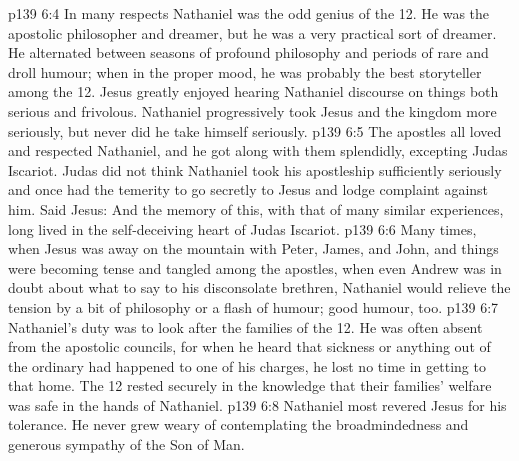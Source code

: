 \vs p139 6:4 In many respects Nathaniel was the odd genius of the 12. He was the apostolic philosopher and dreamer, but he was a very practical sort of dreamer. He alternated between seasons of profound philosophy and periods of rare and droll humour; when in the proper mood, he was probably the best storyteller among the 12. Jesus greatly enjoyed hearing Nathaniel discourse on things both serious and frivolous. Nathaniel progressively took Jesus and the kingdom more seriously, but never did he take himself seriously.
\vs p139 6:5 The apostles all loved and respected Nathaniel, and he got along with them splendidly, excepting Judas Iscariot. Judas did not think Nathaniel took his apostleship sufficiently seriously and once had the temerity to go secretly to Jesus and lodge complaint against him. Said Jesus:  And the memory of this, with that of many similar experiences, long lived in the self\hyp{}deceiving heart of Judas Iscariot.
\vs p139 6:6 Many times, when Jesus was away on the mountain with Peter, James, and John, and things were becoming tense and tangled among the apostles, when even Andrew was in doubt about what to say to his disconsolate brethren, Nathaniel would relieve the tension by a bit of philosophy or a flash of humour; good humour, too.
\vs p139 6:7 Nathaniel’s duty was to look after the families of the 12. He was often absent from the apostolic councils, for when he heard that sickness or anything out of the ordinary had happened to one of his charges, he lost no time in getting to that home. The 12 rested securely in the knowledge that their families’ welfare was safe in the hands of Nathaniel.
\vs p139 6:8 \pc Nathaniel most revered Jesus for his tolerance. He never grew weary of contemplating the broadmindedness and generous sympathy of the Son of Man.
